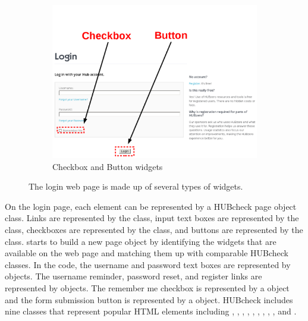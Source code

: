 \begin{figure}
\begin{subfigure}[b]{0.5\textwidth}
        \end{subfigure}
        \begin{subfigure}[b]{0.5\textwidth}
                \centering
                \includegraphics[width=\textwidth]{../../images/annotated/hubzero_login_page_cb_button.png}
                \caption{Checkbox and Button widgets}
                \label{fig:login_page_cb_button}
        \end{subfigure}
        \caption{The login web page is made up of several types of widgets.}
        \label{fig:login_page_widgets}
\end{figure}

On the login page, each element can be represented by a HUBcheck page object
class. Links are represented by the  class, input text boxes are
represented by the  class, checkboxes are represented by the
 class, and buttons are represented by the 
class.   starts to build a new
 page object by identifying the widgets that are available on
the web page and matching them up with comparable HUBcheck classes.  In the
code, the username and password text boxes are represented by 
objects. The username reminder, password reset, and register links are
represented by  objects. The remember me checkbox is represented
by a  object and the form submission button is represented
by a  object.  HUBcheck includes nine classes that represent
popular HTML elements including , ,
, , , ,
, , , and
.

